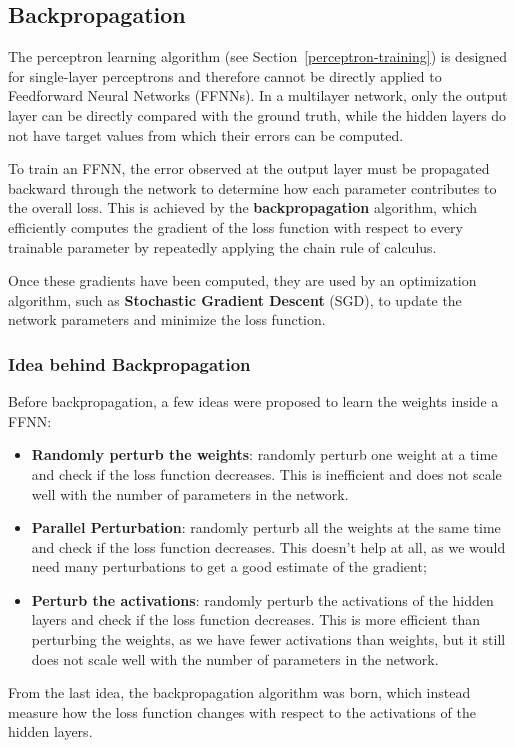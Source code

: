 \subsection{Backpropagation}
The perceptron learning algorithm (see Section~\ref{perceptron-training}) is designed for single-layer perceptrons and therefore cannot be directly applied to Feedforward Neural Networks (FFNNs). 
In a multilayer network, only the output layer can be directly compared with the ground truth, while the hidden layers do not have target values from which their errors can be computed.

To train an FFNN, the error observed at the output layer must be propagated backward through the network to determine how each parameter contributes to the overall loss. 
This is achieved by the \textbf{backpropagation} algorithm, which efficiently computes the gradient of the loss function with respect to every trainable parameter by repeatedly applying the chain rule of calculus.

Once these gradients have been computed, they are used by an optimization algorithm, such as \textbf{Stochastic Gradient Descent} (SGD), to update the network parameters and minimize the loss function.

\subsubsection{Idea behind Backpropagation}
Before backpropagation, a few ideas were proposed to learn the weights inside a FFNN:
\begin{itemize}
    \item \textbf{Randomly perturb the weights}: randomly perturb one weight at a time and check
    if the loss function decreases. This is inefficient and does not scale well with the number of parameters in the network.
    \item \textbf{Parallel Perturbation}: randomly perturb all the weights at the same time and check if the loss function decreases.
    This doesn't help at all, as we would need many perturbations to get a good estimate of the gradient;
    \item \textbf{Perturb the activations}: randomly perturb the activations of the hidden layers and check if the loss function decreases. 
    This is more efficient than perturbing the weights, as we have fewer activations than weights, but it still does not scale well with the number of parameters in the network.
\end{itemize}
From the last idea, the backpropagation algorithm was born, which instead measure how the loss function changes with respect to the activations of the hidden layers.

